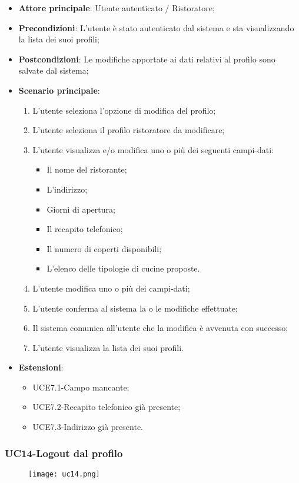 \begin{itemize}
\item \textbf{Attore principale}: Utente autenticato / Ristoratore;
\item \textbf{Precondizioni}: L'utente è stato autenticato dal sistema e sta visualizzando la lista dei suoi profili;
\item \textbf{Postcondizioni}: Le modifiche apportate ai dati relativi al profilo sono salvate dal sistema;
\item \textbf{Scenario principale}:
\begin{enumerate}
\item L'utente seleziona l'opzione di modifica del profilo;
\item L'utente seleziona il profilo ristoratore da modificare;
\item L'utente visualizza e/o modifica uno o più dei seguenti campi-dati:
\begin{itemize}
\item Il nome del ristorante;
\item L'indirizzo;
\item Giorni di apertura;
\item Il recapito telefonico;
\item Il numero di coperti disponibili;
\item L'elenco delle tipologie di cucine proposte.
\end{itemize}
\item L'utente modifica uno o più dei campi-dati;
\item L'utente conferma al sistema la o le modifiche effettuate;
\item Il sistema comunica all'utente che la modifica è avvenuta con successo;
\item L'utente visualizza la lista dei suoi profili.
\end{enumerate}
\item \textbf{Estensioni}:
\begin{itemize}
\item UCE7.1-Campo mancante;
\item UCE7.2-Recapito telefonico già presente;
\item UCE7.3-Indirizzo già presente.
\end{itemize}
\end{itemize}

\subsubsection{UC14-Logout dal profilo}
\begin{figure}[h] \texttt{[image: uc14.png]} \end{figure}

